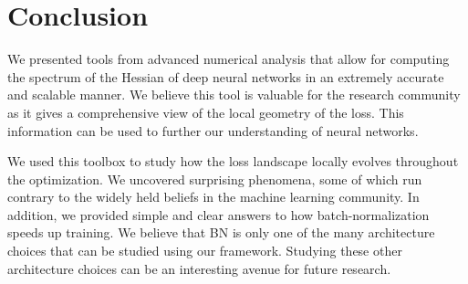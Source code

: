 \documentclass{article}
\begin{document}
\section{Conclusion}

We presented tools from advanced numerical analysis that allow for computing the spectrum of the Hessian of deep neural networks in an extremely accurate and scalable manner. We believe this tool is valuable for the research community as it gives a comprehensive view of the local geometry of the loss. This information can be used to further our understanding of neural networks.

We used this toolbox to study how the loss landscape locally evolves throughout the optimization. We uncovered surprising phenomena, some of which run contrary to the widely held beliefs in the machine learning community. In addition, we provided simple and clear answers to how batch-normalization speeds up training. We believe that BN is only one of the many architecture choices that can be studied using our framework. Studying these other architecture choices can be an interesting avenue for future research. 




%

\newpage
\clearpage
\cleardoublepage
\appendix
\newpage
\end{document}
